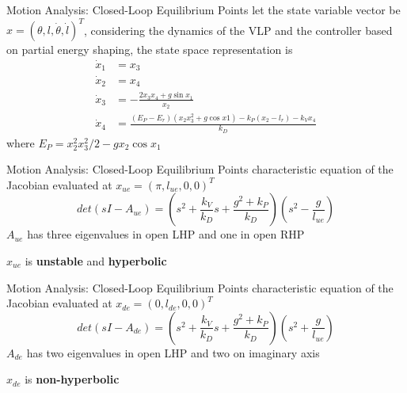 \documentclass[10pt]{beamer}
\begin{document}
  \begin{frame}{Motion Analysis: Closed-Loop Equilibrium Points}
    let the state variable vector be $x = (\theta, l, \dot{\theta},
    \dot{l})^T$, considering the dynamics of the VLP and the controller based
    on partial energy shaping, the state space representation is 
    \begin{align*}
      \dot{x}_1 &= x_3 \\
      \dot{x}_2 &= x_4 \\
      \dot{x}_3 &= -\frac{2 x_3 x_4 + g\sin x_1}{x_2} \\
      \dot{x}_4 &= \frac{(E_P-E_r)(x_2 x_3^2 + g\cos x1)
        -k_P(x_2-l_r)-k_V x_4}{k_D}
    \end{align*}
    where $E_P=x_2^2 x_3^2 / 2 - g x_2 \cos x_1$
  \end{frame}

  \begin{frame}{Motion Analysis: Closed-Loop Equilibrium Points}
    characteristic equation of the Jacobian evaluated
    at $x_{ue} = (\pi, l_{ue}, 0, 0)^T$
    \begin{equation*}
      det(sI-A_{ue}) = \left( s^2 + \frac{k_V}{k_D}s +
        \frac{g^2+k_P}{k_D} \right) \left( s^2 - \frac{g}{l_{ue}}\right)
    \end{equation*}
    $A_{ue}$ has three eigenvalues in open LHP and
    one in open RHP
    
    $x_{ue}$ is \textbf{unstable} and \textbf{hyperbolic}
  \end{frame}

  \begin{frame}{Motion Analysis: Closed-Loop Equilibrium Points}
    characteristic equation of the Jacobian evaluated
    at $x_{de} = (0, l_{de}, 0, 0)^T$
    \begin{equation*}
      det(sI-A_{de}) = \left( s^2 + \frac{k_V}{k_D}s +
        \frac{g^2+k_P}{k_D} \right) \left( s^2 + \frac{g}{l_{ue}}\right)
    \end{equation*}
    $A_{de}$ has two eigenvalues in open LHP and two on imaginary axis
    
    $x_{de}$ is \textbf{non-hyperbolic}
  \end{frame}
\end{document}
